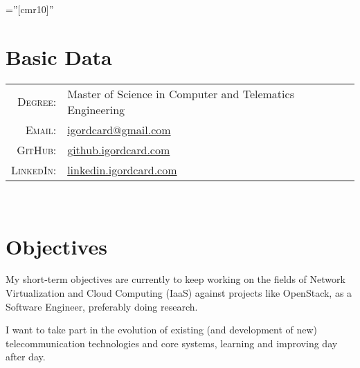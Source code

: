 \documentclass[letter,10pt]{article} %
\begin{document}
\pagestyle{empty} %

\font\fb=''[cmr10]'' %



\par{\bigskip\par} %

\section{Basic Data}

\begin{tabular}{rl}
\textsc{Degree:} & Master of Science in Computer and Telematics Engineering\\
\textsc{Email:} & \href{mailto:igordcard+cv@gmail.com}{igordcard@gmail.com}\\
\textsc{GitHub:} & \href{http://github.igordcard.com}{github.igordcard.com}\\
\textsc{LinkedIn:} & \href{http://linkedin.igordcard.com}{linkedin.igordcard.com}\\
\end{tabular} \\


\section{Objectives}

My short-term objectives are currently to keep working on the fields of Network Virtualization and Cloud Computing (IaaS) against projects like OpenStack, as a Software Engineer, preferably doing research.

I want to take part in the evolution of existing (and development of new) telecommunication technologies 
and core systems, learning and improving day after day. \\
\end{document}
